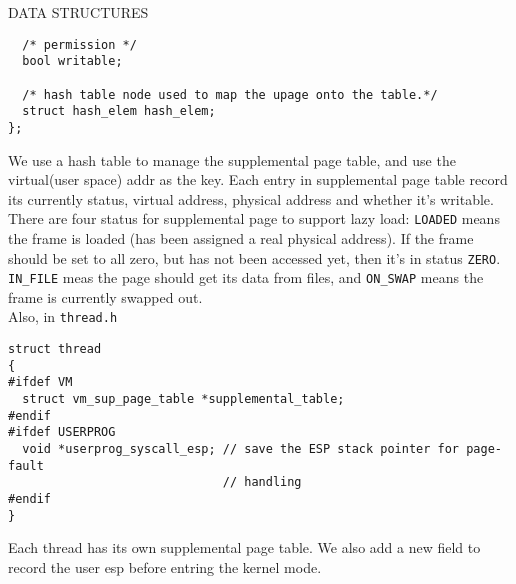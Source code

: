 \begin{aspect}{DATA STRUCTURES}
\begin{lstlisting}
  /* permission */
  bool writable;

  /* hash table node used to map the upage onto the table.*/
  struct hash_elem hash_elem;
};
\end{lstlisting}
  We use a hash table to manage the supplemental page table, and use the virtual(user space) addr as the key. Each entry in supplemental page table record its currently status, virtual address, physical address and whether it's writable. There are four status for supplemental page to support lazy load: \texttt{LOADED} means the frame is loaded (has been assigned a real physical address). If the frame should be set to all zero, but has not been accessed yet, then it's in status \texttt{ZERO}. \texttt{IN\_FILE} meas the page should get its data from files, and \texttt{ON\_SWAP} means the frame is currently swapped out.\\
  Also, in \texttt{thread.h}\\
  \begin{lstlisting}
struct thread
{
#ifdef VM
  struct vm_sup_page_table *supplemental_table;
#endif
#ifdef USERPROG
  void *userprog_syscall_esp; // save the ESP stack pointer for page-fault
                              // handling
#endif
}
\end{lstlisting}
  Each thread has its own supplemental page table. We also add a new field to record the user esp before entring the kernel mode.
\end{aspect}

